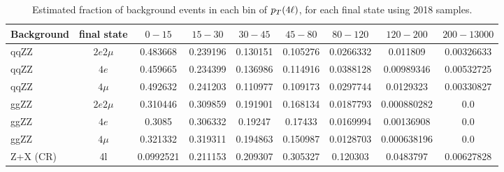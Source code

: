 \begin{table}[!h!tb]
\begin{center}
\scriptsize
    \caption{
        Estimated fraction of background events in each bin of $p_T(4\ell)$, for each final state using 2018 samples.
\label{tab:fractions_pT4l}
}
\begin{tabular}{|l|c|c|c|c|c|c|c|c|}
\hline
Background & final state & $0-15$ & $15-30$ & $30-45$ & $45-80$ & $80-120$ & $120-200$ & $200-13000$ \\ \hline
qqZZ& $2e2\mu$  & 0.483668  & 0.239196  & 0.130151  & 0.105276 & 0.0266332  & 0.011809  & 0.00326633 \\
qqZZ& $4e$  & 0.459665  & 0.234399  & 0.136986  & 0.114916 & 0.0388128  & 0.00989346  & 0.00532725 \\
qqZZ& $4\mu$  & 0.492632  & 0.241203  & 0.110977  & 0.109173 & 0.0297744  & 0.0129323  & 0.00330827 \\
\hline
ggZZ& $2e2\mu$  &  0.310446 & 0.309859  & 0.191901  & 0.168134 & 0.0187793  & 0.000880282  & 0.0 \\
ggZZ& $4e$  & 0.3085  & 0.306332  & 0.19247  & 0.17433 & 0.0169994  & 0.00136908  & 0.0 \\
ggZZ& $4\mu$  & 0.321332  & 0.319311  & 0.194863  & 0.150987 & 0.0128703  & 0.000638196  & 0.0 \\
\hline
Z+X (CR)& 4l  & 0.0992521  & 0.211153  & 0.209307 & 0.305327  & 0.120303  & 0.0483797 & 0.00627828 \\
\hline
\end{tabular}
\normalsize
\end{center}
\end{table}
%
